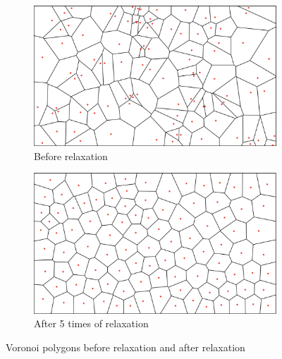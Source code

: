 \begin{figure}
\centering
  \begin{subfigure}{.5\textwidth}
    \centering
    \includegraphics[width=.99\textwidth]{section04/assets/Map-voronoi.png}
    \caption{Before relaxation}
    \label{fig:Voronoi polygons}
  \end{subfigure}%
  \begin{subfigure}{.5\textwidth}
    \centering
    \includegraphics[width=.99\textwidth]{section04/assets/Map-voronoi-relaxation.png}
    \caption{After 5 times of relaxation}
    \label{fig:Voronoi relaxed polygons}
  \end{subfigure}
  \caption{Voronoi polygons before relaxation and after relaxation}
  \label{fig:Voronoi polygons before and after Lloyd relaxation}
\end{figure}

